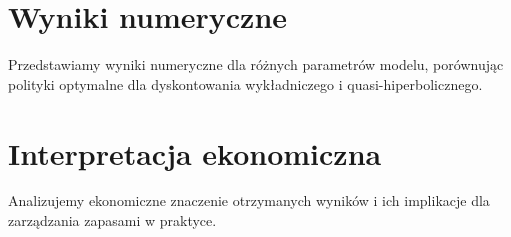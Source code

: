 \section{Wyniki numeryczne}

Przedstawiamy wyniki numeryczne dla różnych parametrów modelu, porównując polityki optymalne dla dyskontowania wykładniczego i quasi-hiperbolicznego.

\section{Interpretacja ekonomiczna}

Analizujemy ekonomiczne znaczenie otrzymanych wyników i ich implikacje dla zarządzania zapasami w praktyce.
